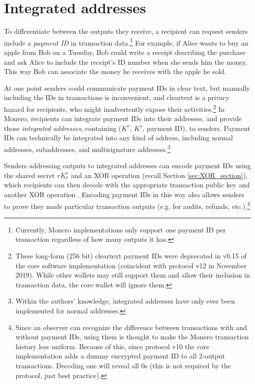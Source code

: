 \section{Integrated addresses}
\label{sec:integrated-addresses}

To differentiate between the outputs they receive, a recipient can request senders include a {\em payment ID} in transaction data.\footnote{Currently, Monero implementations only support one payment ID per transaction regardless of how many outputs it has.} For example, if Alice wants to buy an apple from Bob on a Tuesday, Bob could write a receipt describing the purchase and ask Alice to include the receipt's ID number when she sends him the money. This way Bob can associate the money he receives with the apple he sold.

At one point senders could communicate payment IDs in clear text, but manually including the IDs in transactions is inconvenient, and cleartext is a privacy hazard for recipients, who might inadvertently expose their activities.\footnote{These long-form (256 bit) cleartext payment IDs were deprecated in v0.15 of the core software implementation (coincident with protocol v12 in November 2019). While other wallets may still support them and allow their inclusion in transaction data, the core wallet will ignore them.} In Monero, recipients can integrate payment IDs into their addresses, and provide those {\em integrated addresses}, containing ($K^v$, $K^s$, payment ID), to senders. Payment IDs can technically be integrated into any kind of address, including normal addresses, subaddresses, and multisignature addresses.\footnote{Within the authors' knowledge, integrated addresses have only ever been implemented for normal addresses.}

Senders addressing outputs to integrated addresses can encode payment IDs using the shared secret $r K_t^v$ and an XOR operation (recall Section \ref{sec:XOR_section}), which recipients can then decode with the appropriate transaction public key and another XOR operation \cite{integrated-addresses}. Encoding payment IDs in this way also allows senders to prove they made particular transaction outputs (e.g. for audits, refunds, etc.).\footnote{Since an observer can recognize the difference between transactions with and without payment IDs, using them is thought to make the Monero transaction history less uniform. Because of this, since protocol v10 the core implementation adds a dummy encrypted payment ID to all 2-output transactions. Decoding one will reveal all 0s (this is not required by the protocol, just best practice).}


